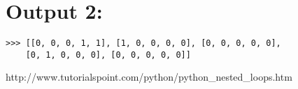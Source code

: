 \documentclass{tufte-book}
\begin{document}
\normalsize
\section{\textbf{Output 2:}}
\begin{shaded}
\begin{verbatim}
>>> [[0, 0, 0, 1, 1], [1, 0, 0, 0, 0], [0, 0, 0, 0, 0],
    [0, 1, 0, 0, 0], [0, 0, 0, 0, 0]]
\end{verbatim}
\end{shaded}
   
%
%
%
% 
% 
% 
 




%

http://www.tutorialspoint.com/python/python_nested_loops.htm


\printindex
\end{document}
